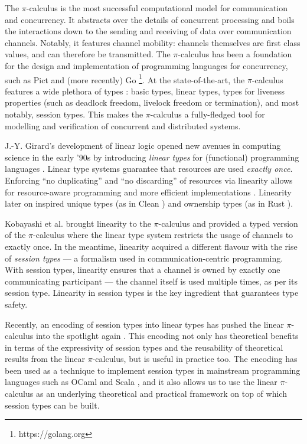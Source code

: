 \documentclass[sigplan,10pt,anonymous,review]{acmart}
\theoremstyle{definition}
\newcommand{\picalc}{$\pi$-calculus}
\begin{document}
The \picalc{} \cite{MilnerPW92,Milner99} is the most successful computational model for communication and concurrency.
It abstracts over the details of concurrent processing and boils the interactions down to the sending and receiving of data over communication channels.
Notably, it features channel mobility: channels themselves are first class values, and can therefore be transmitted.
The \picalc{} has been a foundation for the design and implementation of programming languages for concurrency, such as Pict \cite{PierceT00} and (more recently) Go \footnote{https://golang.org}.
At the state-of-the-art, the \picalc{} features a wide plethora of types \cite{K07}: basic types, linear types, types for liveness properties (such as deadlock freedom, livelock freedom or termination), and most notably, session types. This makes the \picalc{} a fully-fledged tool for modelling and verification of concurrent and distributed systems.

J.-Y. Girard's development of linear logic \cite{Girard87} opened new avenues in computing science in the early '90s by introducing \emph{linear types} for (functional) programming languages \cite{Wadler90,Bernardy2018}.
Linear type systems guarantee that resources are used \emph{exactly once}.
Enforcing ``no duplicating'' and ``no discarding'' of resources via linearity allows for resource-aware programming and more efficient implementations \cite{Wadler90}.
Linearity later on inspired unique types (as in Clean \cite{BarendsenS96}) and ownership types (as in Rust \cite{MatsakisK14}).

Kobayashi et al. \cite{KPT96} brought linearity to the \picalc{} and provided a typed version of the \picalc{} where the linear type system restricts the usage of channels to exactly once.
%
In the meantime, linearity acquired a different flavour with the rise of \emph{session types} \cite{H93,THK94,HVK98} --- a formalism used in communication-centric programming.
With session types, linearity ensures that a channel is owned by exactly one communicating participant --- the channel itself is used multiple times, as per its session type.
Linearity in session types is the key ingredient that guarantees type safety.

Recently, an encoding of session types into linear types \cite{DardhaGS12,Dardha14,DardhaGS17} has pushed the linear \picalc{} into the spotlight again \cite{KPT96}.
This encoding not only has theoretical benefits in terms of the expressivity of session types and the reusability of theoretical results from the linear \picalc{}, but is useful in practice too.
The encoding has been used as a technique to implement session types in mainstream programming languages such as OCaml \cite{Padovani17} and Scala \cite{ScalasY16,ScalasDHY17}, and it also allows us to use the linear \picalc{} as an underlying theoretical and practical framework on top of which session types can be built.
\end{document}
